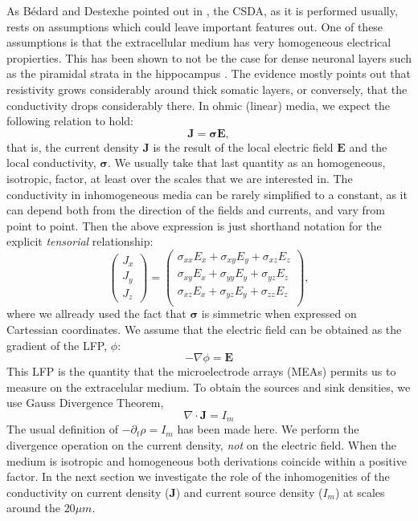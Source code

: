 \documentclass{article}
\newcommand{\Jd}{\mathbf{J}}
\newcommand{\EF}{\mathbf{E}}
\newcommand{\cond}{\boldsymbol{\sigma}}
\begin{document}
As Bédard and Destexhe pointed out in \cite{Bedard11}, the CSDA, as it
is performed usually, rests on
assumptions which could leave important features out. One of these 
assumptions is that the extracellular medium has very homogeneous 
electrical propierties. This has been shown to not be
the case for dense neuronal layers such as the piramidal
strata in the hippocampus \cite{Holsheimer87, Lopez01, TrevinoPersonal}.
The evidence mostly points out that resistivity grows 
considerably around thick somatic layers, or conversely, that
the conductivity drops considerably there. In ohmic (linear) media,
we expect the following relation to hold:
\begin{equation}
\Jd=\cond \EF,
\end{equation}
that is, the current density $\Jd$ is the result of the
local electric field $\EF$ and the local conductivity, $\cond$.
We usually take that last quantity as an homogeneous, isotropic,
factor, at least over the scales that we are interested in.
The conductivity in inhomogeneous media can be rarely
simplified to a constant, as it can depend both from the direction
of the fields and currents, and vary from point to point. 
Then the above expression is just shorthand notation for the
explicit  \emph{tensorial} relationship:
\begin{equation}
  \begin{pmatrix}
    J_x \\
    J_y \\
    J_z
  \end{pmatrix}
  =
   \begin{pmatrix}
     \sigma_{xx}E_x+ \sigma_{xy}E_y+\sigma_{xz}E_z \\
     \sigma_{xy}E_x+ \sigma_{yy}E_y+\sigma_{yz}E_z \\
     \sigma_{xz}E_x+ \sigma_{yz}E_y+\sigma_{zz}E_z \\
  \end{pmatrix},
\end{equation}
where we allready used the fact that $\cond$ is simmetric when
expressed on Cartessian coordinates.
We assume that the electric field can be obtained as the
gradient of the LFP, $\phi$:
\begin{equation}
  -\nabla \phi=\EF
\end{equation}
This LFP is the quantity that the microelectrode arrays (MEAs) permits us
to measure on the extracelular medium.
To obtain the sources and sink densities, we use Gauss Divergence Theorem,
\begin{equation}
\nabla \cdot \Jd =I_m
\end{equation}
The usual definition of $-\partial_t \rho =I_m$ has been made here. 
We perform the divergence operation on the current density, \emph{not}
on the electric field. When the medium is isotropic and homogeneous
both derivations coincide within a positive factor. 
In the next section we investigate the role of the inhomogenities 
of the conductivity on current density
($\Jd$) and current source density ($I_m$) at scales around
the $20\mu m$. 
\end{document}
